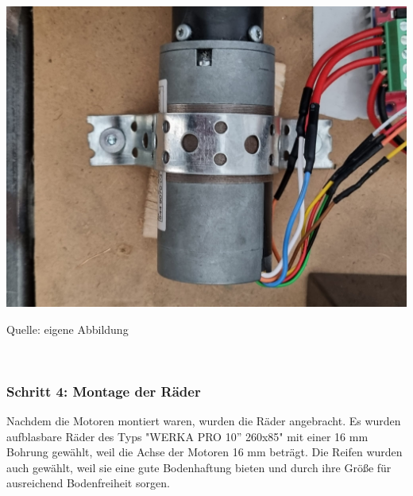 \documentclass[ngerman,12pt,a4paper]{article}
\begin{document}
		\begin{center} 
		\begin{minipage}[t]{0.2\textwidth}
			\includegraphics[scale=0.07]{Pictures/Motor-befestigung2}
			\label{fig:modell-fertig}
			\vspace{-10pt}
			\begin{center}
				\par\small Quelle: eigene Abbildung 
			\end{center}
		\end{minipage} \\[0.75cm]
	\end{center} 
	
	\subsubsection*{Schritt 4: Montage der Räder}
	
	Nachdem die Motoren montiert waren, wurden die Räder angebracht. Es wurden aufblasbare Räder des Typs "WERKA PRO 10'' 260x85" mit einer 16 mm Bohrung gewählt, weil die Achse der Motoren 16 mm beträgt. Die Reifen wurden auch gewählt, weil sie eine gute Bodenhaftung bieten und durch ihre Größe für ausreichend Bodenfreiheit sorgen. 
	
\end{document}
